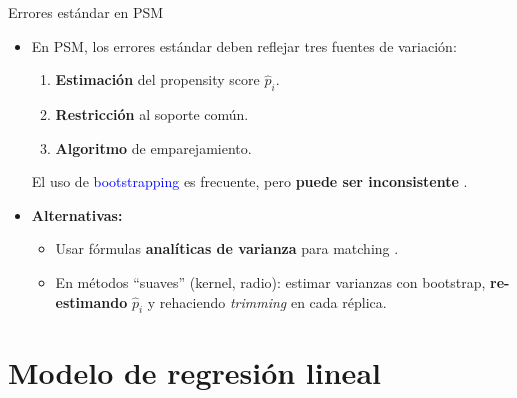 \documentclass[10pt, xcolor=dvipsnames]{beamer}
\begin{document}
\begin{frame}{Errores estándar en PSM}
\begin{itemize}
    \item En PSM, los errores estándar deben reflejar tres fuentes de variación: 
    \vspace{-0.0em}
    \begin{enumerate}
        \item[1)] \textbf{Estimación} del propensity score \(\hat{p}_i\).
        \item[2)] \textbf{Restricción} al soporte común.
        \item[3)] \textbf{Algoritmo} de emparejamiento.
    \end{enumerate}
    \vspace{0.5em}
    El uso de \textcolor{blue}{bootstrapping} \citep{efron1979} es frecuente, pero \textbf{puede ser inconsistente} \citep{abadie2008}.
    \vspace{1.0em}
    \item \textbf{Alternativas:}
    \begin{itemize}
        \item[-] Usar fórmulas \textbf{analíticas de varianza} para matching \citep{Abadie2006, abadie2016}.
        \item[-] En métodos ``suaves'' (kernel, radio): estimar varianzas con bootstrap, \textbf{re-estimando} \(\hat{p}_i\) y rehaciendo \textit{trimming} en cada réplica.
    \end{itemize}
\end{itemize}
\end{frame}


\section{Modelo de regresión lineal}
\end{document}
